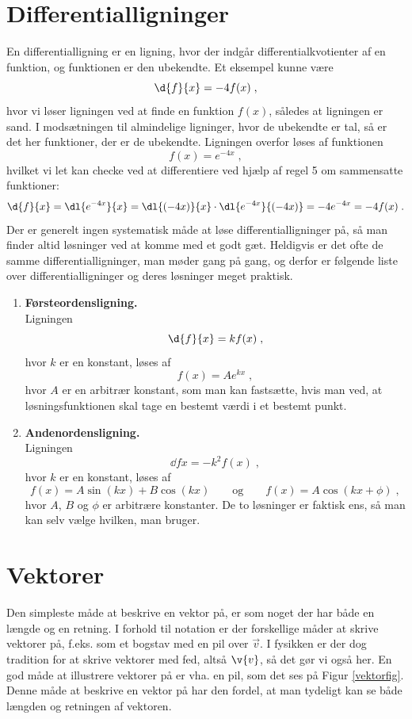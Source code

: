 \section{Differentialligninger} \label{sec:difflign}
En differentialligning er en ligning, hvor der indgår
differentialkvotienter af en funktion, og funktionen er den
ubekendte. Et eksempel kunne være
\[
\d{f}{x} = -4 f(x) \; ,
\]
hvor vi løser ligningen ved at finde en funktion $f(x)$, således at
ligningen er sand. I modsætningen til almindelige ligninger, hvor de
ubekendte er tal, så er det her funktioner, der er de
ubekendte. Ligningen overfor løses af funktionen
\[
f(x) = e^{-4x} \; ,
\]
hvilket vi let kan checke ved at differentiere ved hjælp af regel 5 om
sammensatte funktioner:
\[
\d{f}{x} = \dl{e^{-4x}}{x}
= \dl{(-4x)}{x} \cdot \dl{e^{-4x}}{(-4x)}
= -4 e^{-4x} = -4 f(x) \; .
\]
Der er generelt ingen systematisk måde at løse differentialligninger
på, så man finder altid løsninger ved at komme med et godt
gæt. Heldigvis er det ofte de samme differentialligninger, man møder
gang på gang, og derfor er følgende liste over differentialligninger
og deres løsninger meget praktisk.

\begin{enumerate}[resume]
\item\label{itm:d-lign1} \textbf{Førsteordensligning.}\\
  Ligningen
  \[
  \d{f}{x} = k f(x) \; ,
  \]
  hvor $k$ er en konstant, løses af
  \[
  f(x) = A e^{kx} \; ,
  \]
  hvor $A$ er en arbitrær konstant, som man kan fastsætte, hvis man
  ved, at løsningsfunktionen skal tage en bestemt værdi i et bestemt
  punkt.
\item\label{itm:d-lign2} \textbf{Andenordensligning.}\\
  Ligningen
  \[
  \dd{f}{x} = -k^2 f(x) \; ,
  \]
  hvor $k$ er en konstant, løses af
  \[
  f(x) = A \sin (kx) + B \cos (kx)
  \qquad \text{og} \qquad
  f(x) = A \cos (kx + \phi) \; ,
  \]
  hvor $A$, $B$ og $\phi$ er arbitrære konstanter. De to løsninger er
  faktisk ens, så man kan selv vælge hvilken, man bruger.
\end{enumerate}

\section{Vektorer}

Den simpleste måde at beskrive en vektor på, er som noget der har både en længde og en retning. I forhold til notation er der forskellige måder at skrive vektorer på, f.eks. som et bogstav med en pil over $\vec{v}$. I fysikken er der dog tradition for at skrive vektorer med fed, altså $\v{v}$, så det gør vi også her. En god måde at illustrere vektorer på er vha. en pil, som det ses på Figur \ref{vektorfig}. Denne måde at beskrive en vektor på har den fordel, at man tydeligt kan se både længden og retningen af vektoren.\\

